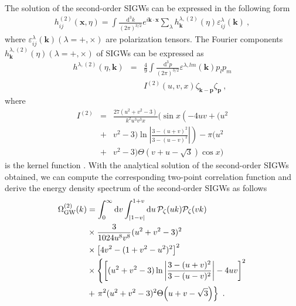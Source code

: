 \documentclass[reprint, 10pt, amsmath, amssymb, floatfix, aps, prd, superscriptaddress, nofootinbib, nobibnotes,twocolumn]{revtex4-1}
\begin{document}
The solution of the second-order \acp{SIGW} can be expressed in the following form
\begin{equation}\label{eq:hms}
\begin{aligned}
h_{i j}^{(2)}(\mathbf{x}, \eta)=\int \frac{\mathrm{d}^3 k}{(2 \pi)^{3 / 2}} e^{i \mathbf{k} \cdot \mathbf{x}}\sum_{\lambda}h_{\mathbf{k}}^{\lambda,(2)}(\eta) \varepsilon_{i j}^{\lambda}(\mathbf{k}) \  ,
\end{aligned}
\end{equation}
where $\varepsilon_{i j}^{\lambda}(\mathbf{k})$$(\lambda=+,\times)$ are polarization tensors. The Fourier components $ h^{\lambda,(2)}_{\mathbf{k}}(\eta)$$(\lambda=+,\times)$ of \acp{SIGW} can be expressed as
\begin{eqnarray}
	h^{\lambda,(2)}(\eta,\mathbf{k})&=&\frac{4}{9}\int\frac{\mathrm{d}^3p}{(2\pi)^{3/2}}\varepsilon^{\lambda,lm}\left(\mathbf{k}\right)p_lp_m \nonumber\\
    &&I^{(2)}\left( u,v,x \right)\zeta_{\mathbf{k}-\mathbf{p}}\zeta_{\mathbf{p}} \ , \label{eq:h11}
\end{eqnarray}
where
\begin{eqnarray}
        I^{(2)}&=&
        \frac{27 (u^2 + v^2 - 3)}{k^2u^3 v^3 x}
        \bigg(
            \sin x 
            \left(
                -4 u v + (u^2  \right.\nonumber\\
            &+&\left.v^2- 3) 
                \ln \left| \frac{3 - (u + v)^2}{3 - (u - v)^2} \right|
            \right)-\pi(u^2 \nonumber\\
        &+& v^2 - 3) \Theta(v + u - \sqrt{3}) \cos x
        \bigg)  \label{eq:11I}
\end{eqnarray}
is the kernel function \cite{Kohri:2018awv}. With the analytical solution of the second-order \acp{SIGW} obtained, we can compute the corresponding two-point correlation function and derive the energy density spectrum of the second-order \acp{SIGW} as follows \cite{Espinosa:2018eve,Kohri:2018awv}
\begin{align}
    \Omega_{\mathrm{GW}}^{(2)}(k) &= \int_{0}^{\infty} \mathrm{d}v \int_{|1-v|}^{1+v} \mathrm{d}u\,
    \mathcal{P}_{\zeta}(uk) \mathcal{P}_{\zeta}(vk) \notag \\
    &\times  \frac{3}{1024 u^8 v^8} (u^2 + v^2 - 3)^2 \notag \\
    &\times \left[4v^2 - (1 + v^2 - u^2)^2\right]^2 \notag \\
    &\times \left\{ \left[(u^2 + v^2 - 3) \ln \left| \frac{3 - (u + v)^2}{3 - (u - v)^2} \right| - 4uv \right]^2 \right. \notag \\
    & + \left.  \pi^2 (u^2 + v^2 - 3)^2 \Theta \Big(u + v - \sqrt{3} \Big) \right\} \ .
    \label{eq:1Oss}
\end{align}
\end{document}
